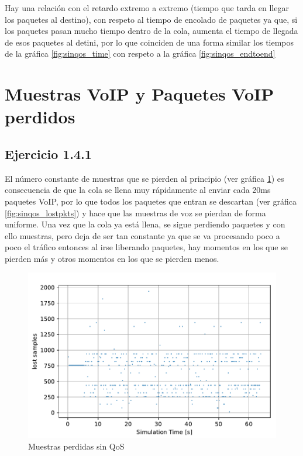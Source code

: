 Hay una relación con el retardo extremo a extremo (tiempo que tarda en llegar los paquetes al destino), con respeto al tiempo de encolado
de paquetes ya que, si los paquetes pasan mucho tiempo dentro de la cola, aumenta el tiempo de llegada de esos paquetes al detini, por lo que
coinciden de una forma similar los tiempos de la gráfica \ref{fig:sinqos_time} con respeto a la gráfica \ref{fig:sinqos_endtoend}


\section{Muestras VoIP y Paquetes VoIP perdidos}

\subsection{Ejercicio 1.4.1}

El número constante de muestras que se pierden al principio (ver gráfica \ref{fig:sinqos_lostsamples}) es consecuencia de que la cola se llena muy 
rápidamente al enviar cada 20ms paquetes VoIP, por lo que todos los paquetes que entran se descartan (ver gráfica \ref{fig:sinqos_lostpkts}) y hace que 
las muestras de voz se pierdan de forma uniforme. Una vez que la cola ya está llena, se sigue perdiendo paquetes y con ello muestras, pero deja de ser tan constante ya que se
va procesando poco a poco el tráfico entonces al irse liberando paquetes, hay momentos en los que se pierden más y otros momentos 
en los que se pierden menos.

\begin{figure}[!ht]
  \centering
  \includegraphics{graficas/sinQoS/ muestras_perdidas_sinQoS.pdf}
  \caption{Muestras perdidas sin QoS}
  \label{fig:sinqos_lostsamples}
\end{figure}

